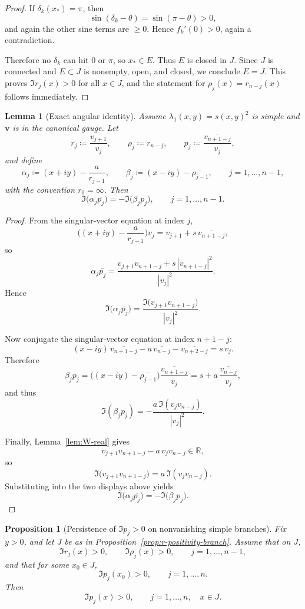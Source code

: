 \documentclass[11pt]{article}
\newtheorem{lemma}[theorem]{Lemma}
\newtheorem{proposition}[theorem]{Proposition}
\begin{document}
\begin{proof}
If \(\delta_k(x_*)=\pi\), then
\[
\sin(\delta_k-\theta)=\sin(\pi-\theta)>0,
\]
and again the other sine terms are \(\ge 0\). Hence \(f_k'(0)>0\), again a contradiction.

Therefore no \(\delta_k\) can hit \(0\) or \(\pi\), so \(x_*\in E\). Thus \(E\) is closed in \(J\). Since \(J\) is connected and \(E\subset J\) is nonempty, open, and closed, we conclude \(E=J\). This proves \(\Im r_j(x)>0\) for all \(x\in J\), and the statement for \(\rho_j(x)=r_{n-j}(x)\) follows immediately.
\end{proof}

\begin{lemma}[Exact angular identity]\label{lem:angular-identity}
Assume \(\lambda_1(x,y)=s(x,y)^2\) is simple and \(\mathbf v\) is in the canonical gauge. Let
\[
r_j\coloneqq \frac{v_{j+1}}{v_j},
\qquad
\rho_j\coloneqq r_{n-j},
\qquad
p_j\coloneqq \frac{\overline{v_{n+1-j}}}{v_j},
\]
and define
\[
\alpha_j\coloneqq (x+iy)-\frac{a}{r_{j-1}},
\qquad
\beta_j\coloneqq (x-iy)-\overline{\rho_{j-1}},
\qquad
j=1,\dots,n-1,
\]
with the convention \(r_0=\infty\). Then
\[
\Im\!\bigl(\alpha_j\overline{p_j}\bigr)
=
-\Im\!\bigl(\beta_j p_j\bigr),
\qquad
j=1,\dots,n-1.
\]
\end{lemma}

\begin{proof}
From the singular-vector equation at index \(j\),
\[
\biggl((x+iy)-\frac{a}{r_{j-1}}\biggr)v_j
=
v_{j+1}+s\,\overline{v_{n+1-j}},
\]
so
\[
\alpha_j\overline{p_j}
=
\frac{v_{j+1}v_{n+1-j}+s\,|v_{n+1-j}|^2}{|v_j|^2}.
\]
Hence
\[
\Im\!\bigl(\alpha_j\overline{p_j}\bigr)
=
\frac{\Im\!\bigl(v_{j+1}v_{n+1-j}\bigr)}{|v_j|^2}.
\]

Now conjugate the singular-vector equation at index \(n+1-j\):
\[
(x-iy)\,\overline{v_{n+1-j}}-a\,\overline{v_{n-j}}-\overline{v_{n+2-j}}
=
s\,v_j.
\]
Therefore
\[
\beta_j p_j
=
\bigl((x-iy)-\overline{\rho_{j-1}}\bigr)\frac{\overline{v_{n+1-j}}}{v_j}
=
s+a\,\frac{\overline{v_{n-j}}}{v_j},
\]
and thus
\[
\Im(\beta_j p_j)
=
-\frac{a\,\Im(v_jv_{n-j})}{|v_j|^2}.
\]

Finally, Lemma~\ref{lem:W-real} gives
\[
v_{j+1}v_{n+1-j}-a\,v_jv_{n-j}\in\mathbb R,
\]
so
\[
\Im\!\bigl(v_{j+1}v_{n+1-j}\bigr)
=
a\,\Im(v_jv_{n-j}).
\]
Substituting into the two displays above yields
\[
\Im\!\bigl(\alpha_j\overline{p_j}\bigr)
=
-\Im\!\bigl(\beta_j p_j\bigr).
\]
\end{proof}

\begin{proposition}[Persistence of \(\Im p_j>0\) on nonvanishing simple branches]\label{prop:p-positivity-branch}
Fix \(y>0\), and let \(J\) be as in Proposition~\ref{prop:r-positivity-branch}. Assume that on \(J\),
\[
\Im r_j(x)>0,
\qquad
\Im \rho_j(x)>0,
\qquad
j=1,\dots,n-1,
\]
and that for some \(x_0\in J\),
\[
\Im p_j(x_0)>0,
\qquad
j=1,\dots,n.
\]
Then
\[
\Im p_j(x)>0,
\qquad
j=1,\dots,n,
\quad x\in J.
\]
\end{proposition}
\end{document}
